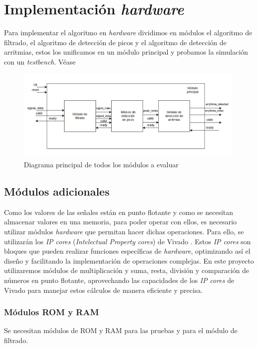 \chapter{Implementación  \textit{hardware} }

Para implementar el algoritmo en  \textit{hardware}  dividimos en módulos el algoritmo de filtrado, el algoritmo
de detección de picos y el algoritmo de detección de arritmias, estos los unificamos en un módulo principal 
y probamos la simulación con un \textit{testbench}. Véase 

\begin{figure}[h!]
    \centering
    \includegraphics[width=0.99\textwidth]{./Images/img_res_experimentales/diagramaGeneral.png}
    \caption{Diagrama principal de todos los módulos a evaluar}
    \label{fig:diagramaGeneral}
\end{figure} 




\section{Módulos adicionales} 

Como los valores de las señales están en punto flotante y como se necesitan almacenar valores en una memoria, para poder operar con ellos, es necesario utilizar módulos  \textit{hardware}  que permitan hacer dichas operaciones. Para ello, se utilizarán los \textit{IP cores} (\textit{Intelectual Property cores}) de Vivado \cite{xilinx_ip_cores}. Estos \textit{IP cores} son bloques que pueden realizar funciones específicas de  \textit{hardware}, optimizando así el diseño y facilitando la implementación de operaciones complejas. En este proyecto utilizaremos módulos de multiplicación y suma, resta, división y comparación de números en punto flotante, aprovechando las capacidades de los \textit{IP cores} de Vivado para manejar estos cálculos de manera eficiente y precisa.
\subsection{Módulos ROM y RAM}
 Se necesitan módulos de ROM y RAM para las pruebas y para el módulo de filtrado.

